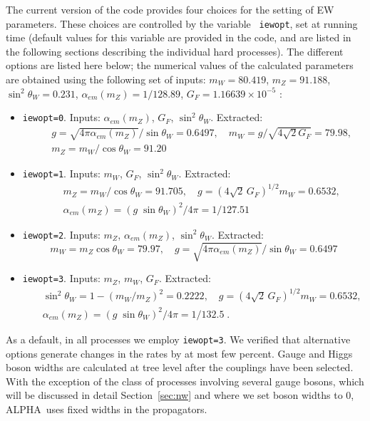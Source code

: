 \documentclass[paper]{JHEP3}
\def    \be             {\begin{equation}}
\def    \ee             {\end{equation}}
\def    \ba             {\begin{eqnarray}}
\def    \ea             {\end{eqnarray}}
\def    \nn             {\nonumber}
\def    \Qbar   {\overline{Q}}
\def    \mZ             {\mbox{$m_Z$} }
\def    \mW             {\mbox{$m_W$} }
\def    \aem             {\mbox{$\alpha_{em}(\mZ)$}}
\def\ALPHA{{\small ALPHA}}
\begin{document}
The current version of the code provides four choices for the setting
of EW parameters. These choices are controlled by the variable {\tt
  iewopt}, set at running time (default values for this variable are
provided in the code, and are listed in the following sections
describing the individual hard processes). The different options are
listed here below;  the numerical values of the calculated parameters are
obtained using the following set of inputs: $\mW=80.419$, $\mZ=91.188$,
$\sin^2\theta_W=0.231$, $\aem=1/128.89$, $G_F=1.16639\times 10^{-5}$ :
\begin{itemize}
\item[~] {\tt iewopt=0}.  Inputs: $\aem$, $G_{F}$,
  $\sin^2 \theta_W$. Extracted:
  \ba &&  g=\sqrt{4\pi\aem}/\sin\theta_W = 0.6497, \quad
         \mW=g/\sqrt{4\sqrt{2} G_F} = 79.98, \label{eq:iew0} \\
      &&   \mZ = \mW/\cos\theta_W = 91.20 \nn
  \ea
\item[~] {\tt iewopt=1}.  Inputs: $\mW$, $G_{F}$,
  $\sin^2 \theta_W$. Extracted:
  \ba && \mZ=\mW/\cos\theta_W = 91.705, \quad 
  g= ( 4\sqrt{2} \, G_F)^{1/2} \mW =0.6532,  \label{eq:iew1} \\ 
     && \aem = (g \; \sin\theta_W)^2/4\pi = 1/127.51 \nn 
  \ea
\item[~] {\tt iewopt=2}.  Inputs: $\mZ$, $\aem$,
  $\sin^2 \theta_W$. Extracted:
  \be \mW=\mZ\cos\theta_W = 79.97 , \quad 
  g=\sqrt{4\pi\aem}/\sin\theta_W = 0.6497  \label{eq:iew2} 
  \ee
\item[~] {\tt iewopt=3}.  Inputs: $\mZ$, $\mW$,
  $G_F$. Extracted:
  \ba && \sin^2\theta_W = 1- (\mW/\mZ)^2 = 0.2222 , \quad 
  g= ( 4\sqrt{2} \, G_F)^{1/2} \mW =0.6532,  \label{eq:iew3} \\
      &&  \aem = (g \; \sin\theta_W)^2/4\pi = 1/132.5 \nn \; .
  \ea
\end{itemize}
As a default, in all processes we employ {\tt iewopt=3}. We verified
that alternative options generate changes in the rates by at most few percent.
Gauge and Higgs boson widths are calculated at tree level after the
couplings have been selected. With the exception of the class of
processes involving several gauge bosons, which will be discussed in detail
Section~\ref{sec:nw} and where we set boson widths to 0,  \ALPHA\  
uses fixed widths in the propagators. 
\end{document}
